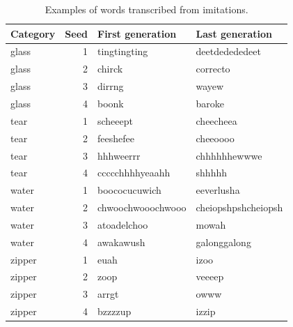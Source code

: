 \documentclass[english,floatsintext,man]{apa6}
\theoremstyle{definition}
\theoremstyle{definition}
\theoremstyle{definition}
\theoremstyle{remark}
\begin{document}
\begin{table}

\caption{\label{tab:table1}Examples of words transcribed from imitations.}
\centering
\begin{tabular}[t]{l|r|l|l}
\hline
Category & Seed & First generation & Last generation\\
\hline
glass & 1 & tingtingting & deetdedededeet\\
\hline
glass & 2 & chirck & correcto\\
\hline
glass & 3 & dirrng & wayew\\
\hline
glass & 4 & boonk & baroke\\
\hline
tear & 1 & scheeept & cheecheea\\
\hline
tear & 2 & feeshefee & cheeoooo\\
\hline
tear & 3 & hhhweerrr & chhhhhhewwwe\\
\hline
tear & 4 & ccccchhhhyeaahh & shhhhh\\
\hline
water & 1 & boococucuwich & eeverlusha\\
\hline
water & 2 & chwoochwooochwooo & cheiopshpshcheiopsh\\
\hline
water & 3 & atoadelchoo & mowah\\
\hline
water & 4 & awakawush & galonggalong\\
\hline
zipper & 1 & euah & izoo\\
\hline
zipper & 2 & zoop & veeeep\\
\hline
zipper & 3 & arrgt & owww\\
\hline
zipper & 4 & bzzzzup & izzip\\
\hline
\end{tabular}
\end{table}
\end{document}
